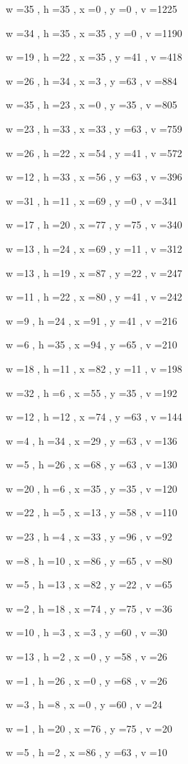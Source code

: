 \documentclass[11pt]{article}
\begin{document}
w =35 , h =35 , x =0 , y =0 , v =1225
\par
w =34 , h =35 , x =35 , y =0 , v =1190
\par
w =19 , h =22 , x =35 , y =41 , v =418
\par
w =26 , h =34 , x =3 , y =63 , v =884
\par
w =35 , h =23 , x =0 , y =35 , v =805
\par
w =23 , h =33 , x =33 , y =63 , v =759
\par
w =26 , h =22 , x =54 , y =41 , v =572
\par
w =12 , h =33 , x =56 , y =63 , v =396
\par
w =31 , h =11 , x =69 , y =0 , v =341
\par
w =17 , h =20 , x =77 , y =75 , v =340
\par
w =13 , h =24 , x =69 , y =11 , v =312
\par
w =13 , h =19 , x =87 , y =22 , v =247
\par
w =11 , h =22 , x =80 , y =41 , v =242
\par
w =9 , h =24 , x =91 , y =41 , v =216
\par
w =6 , h =35 , x =94 , y =65 , v =210
\par
w =18 , h =11 , x =82 , y =11 , v =198
\par
w =32 , h =6 , x =55 , y =35 , v =192
\par
w =12 , h =12 , x =74 , y =63 , v =144
\par
w =4 , h =34 , x =29 , y =63 , v =136
\par
w =5 , h =26 , x =68 , y =63 , v =130
\par
w =20 , h =6 , x =35 , y =35 , v =120
\par
w =22 , h =5 , x =13 , y =58 , v =110
\par
w =23 , h =4 , x =33 , y =96 , v =92
\par
w =8 , h =10 , x =86 , y =65 , v =80
\par
w =5 , h =13 , x =82 , y =22 , v =65
\par
w =2 , h =18 , x =74 , y =75 , v =36
\par
w =10 , h =3 , x =3 , y =60 , v =30
\par
w =13 , h =2 , x =0 , y =58 , v =26
\par
w =1 , h =26 , x =0 , y =68 , v =26
\par
w =3 , h =8 , x =0 , y =60 , v =24
\par
w =1 , h =20 , x =76 , y =75 , v =20
\par
w =5 , h =2 , x =86 , y =63 , v =10
\par
\newpage
\end{document}
